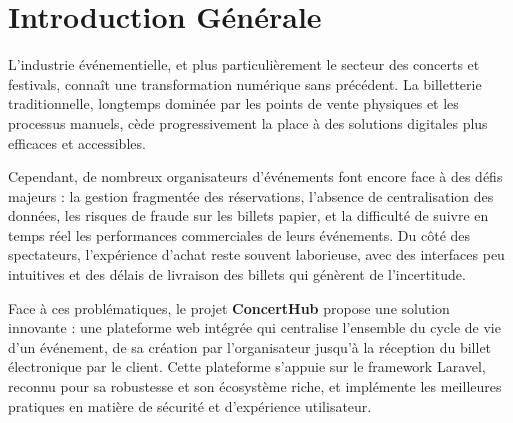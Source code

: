 \documentclass[a4paper,12pt,twoside]{report}
\begin{document}
\newpage
{}
\tableofcontents
\thispagestyle{empty}

\newpage
\listoffigures
{}
\thispagestyle{empty}

\newpage
\listoftables
{}
\thispagestyle{empty}

\newpage
\printglossary[type=\acronymtype,title=Acronymes]
\thispagestyle{empty}

\newpage
\chapter*{Introduction Générale}
\thispagestyle{plain}

L'industrie événementielle, et plus particulièrement le secteur des concerts et festivals, connaît une transformation numérique sans précédent. La billetterie traditionnelle, longtemps dominée par les points de vente physiques et les processus manuels, cède progressivement la place à des solutions digitales plus efficaces et accessibles.

Cependant, de nombreux organisateurs d'événements font encore face à des défis majeurs : la gestion fragmentée des réservations, l'absence de centralisation des données, les risques de fraude sur les billets papier, et la difficulté de suivre en temps réel les performances commerciales de leurs événements. Du côté des spectateurs, l'expérience d'achat reste souvent laborieuse, avec des interfaces peu intuitives et des délais de livraison des billets qui génèrent de l'incertitude.

Face à ces problématiques, le projet \textbf{ConcertHub} propose une solution innovante : une plateforme web intégrée qui centralise l'ensemble du cycle de vie d'un événement, de sa création par l'organisateur jusqu'à la réception du billet électronique par le client. Cette plateforme s'appuie sur le framework Laravel, reconnu pour sa robustesse et son écosystème riche, et implémente les meilleures pratiques en matière de sécurité et d'expérience utilisateur.
\end{document}
